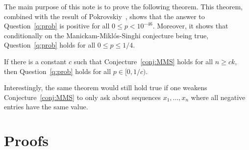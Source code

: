 \documentclass[11pt]{amsart}
\newtheorem{question}[theorem]{\bf Question}
\theoremstyle{definition}
\def\eps{\varepsilon}
\begin{document}



The main purpose of this note is to prove the following theorem. This theorem, combined with the result of Pokrovskiy~\cite{Pok15}, shows that the answer to Question~\ref{q:prob} is positive for all $0\leq p< 10^{-46}$. Moreover, it shows that conditionally on the Manickam-Mikl\'os-Singhi conjecture being true, Question~\ref{q:prob} holds for all $0\leq p\leq 1/4$.

\begin{theorem}\label{thm:main}
If there is a constant $c$ such that Conjecture~\ref{conj:MMS} holds for all $n\geq ck$, then Question~\ref{q:prob} holds for all $p\in [0, 1/c)$.
\end{theorem}

Interestingly, the same theorem would still hold true if one weakens Conjecture~\ref{conj:MMS} to only ask about sequences $x_1, \dots, x_n$ where all negative entries have the same value.

\section{Proofs}
\end{document}
